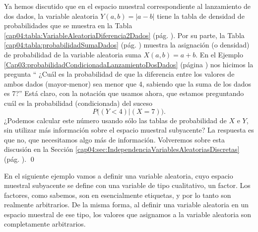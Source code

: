 \begin{Ejemplo}\label{cap04:ejem:VariablesAleatoriasEliminanInformacion}
    Ya hemos discutido que en el espacio muestral correspondiente al lanzamiento de dos dados, la variable aleatoria $Y(a,b)=|a-b|$ tiene la tabla de densidad de probabilidades que se muestra en la Tabla \ref{cap04:tabla:VariableAleatoriaDiferencia2Dados} (pág. \pageref{cap04:tabla:VariableAleatoriaDiferencia2Dados}).
    Por su parte, la Tabla \ref{cap04:tabla:probabilidadSumaDados} (pág. \pageref{cap04:tabla:probabilidadSumaDados}) muestra la asignación (o densidad) de probabilidad de la variable aleatoria suma $X(a,b)=a+b$.
    En el Ejemplo \ref{Cap03:probabilidadCondicionadaLanzamientoDosDados} (página \pageref{Cap03:probabilidadCondicionadaLanzamientoDosDados}) nos hicimos la pregunta `` ¿Cuál es la probabilidad de que la diferencia entre los valores de ambos dados (mayor-menor) sea menor que 4, sabiendo que la suma de los dados es 7?''  Está claro, con la notación que usamos ahora, que estamos preguntando cuál es la probabilidad (condicionada) del suceso
    \[P\Big((Y<4)|(X=7)\Big).\]
    ¿Podemos calcular este número usando sólo las tablas de probabilidad de $X$ e $Y$, sin utilizar más información sobre el espacio muestral subyacente? La respuesta es que no, que necesitamos algo más de información. Volveremos sobre esta discusión en la Sección \ref{cap04:sec:IndependenciaVariablesAleatoriasDiscretas} (pág. \pageref{cap04:sec:IndependenciaVariablesAleatoriasDiscretas}).
    \qed
\end{Ejemplo}
En el siguiente ejemplo vamos a definir una variable aleatoria, cuyo espacio muestral subyacente se define con una variable de tipo cualitativo, un factor. Los factores, como sabemos, son en esencialmente etiquetas, y por lo tanto son realmente arbitrarios.  De la misma forma, al definir una variable aleatoria en un espacio muestral de ese tipo, los valores que asignamos a la variable aleatoria son completamente arbitrarios.
